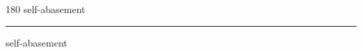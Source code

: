 
\begin{frame}
\begin{center}
\begin{turn}{180}
{\fontsize{2.5cm}{1em}\selectfont self-abasement}
\end{turn}
\vspace{1em}\par  
\hrule
\vspace{1em}\par  
{\fontsize{2.5cm}{1em}\selectfont self-abasement}
\end{center}
\end{frame}
